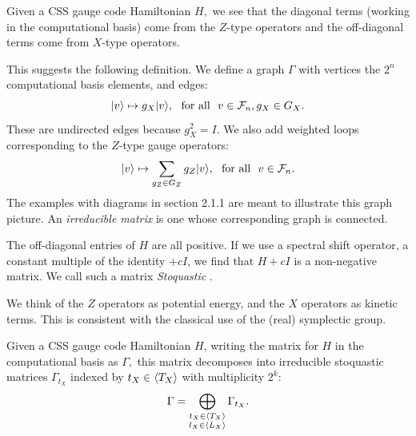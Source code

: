 Given a CSS gauge code Hamiltonian $H,$ we see that 
the diagonal terms (working in the computational basis)
come from the $Z$-type operators and the off-diagonal terms
come from $X$-type operators.

This suggests the following definition.
We define a graph $\Gamma$ with vertices the $2^n$ computational
basis elements, and edges:
$$
    |{v}\rangle \mapsto g_X |{v}\rangle, \ \ \mbox{for all}\ \  v\in\mathcal{F}_{n}, g_X\in G_X.
$$
These are undirected edges because $g_X^2 = I.$
We also add weighted loops corresponding to the $Z$-type gauge operators:
$$
    |{v}\rangle \mapsto \sum_{g_Z\in G_Z} g_Z |{v}\rangle, \ \ \mbox{for all}\ \  v\in\mathcal{F}_{n}.
$$
The examples with diagrams in section 2.1.1 are meant to illustrate this
graph picture.
An \emph{irreducible matrix} is one whose corresponding graph is connected.

The off-diagonal entries of $H$ are all positive.
If we use a spectral shift operator, a constant multiple of the identity $+cI$,
we find that $H+cI$ is a non-negative matrix. 
We call such a matrix \emph{Stoquastic} \cite{Bravyi2008,Bravyi2015}.

We think of the $Z$ operators as potential energy,
and the $X$ operators as kinetic terms.
This is consistent with the classical use of the (real) symplectic 
group.

Given a CSS gauge code Hamiltonian $H$, writing
the matrix for $H$ in the computational basis as $\Gamma,$
this matrix decomposes into irreducible
stoquastic matrices $\Gamma_{t_X}$ 
indexed by $t_X\in\langle T_X \rangle$
with multiplicity $2^k$:
$$
    \Gamma = \bigoplus_{
    \substack{t_X\in\langle T_X \rangle\\l_X\in\langle L_X \rangle}}
        \Gamma_{t_X}.
$$

